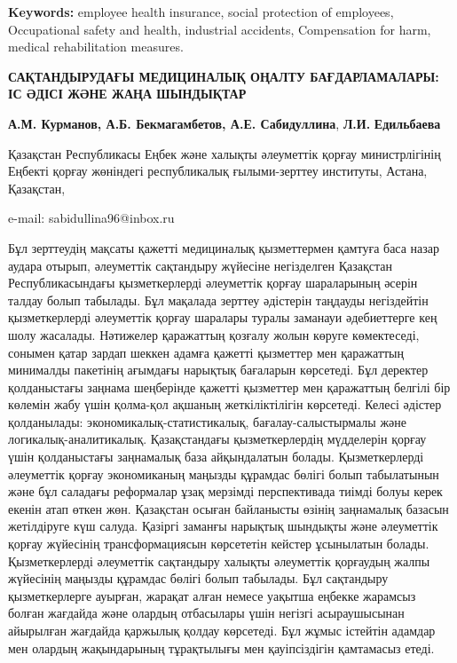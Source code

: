 {\bfseries Keywords:} employee health insurance, social protection of
employees, Occupational safety and health, industrial accidents,
Compensation for harm, medical rehabilitation measures.
\begin{articleheader}

{\bfseries САҚТАНДЫРУДАҒЫ МЕДИЦИНАЛЫҚ ОҢАЛТУ БАҒДАРЛАМАЛАРЫ: ІС ӘДІСІ ЖӘНЕ ЖАҢА ШЫНДЫҚТАР}

{\bfseries А.М. Курманов, А.Б. Бекмагамбетов, А.Е.
Сабидуллина\textsuperscript{\envelope }}, {\bfseries Л.И.} {\bfseries Едильбаева}
\end{articleheader}
\begin{affiliation}

Қазақстан Республикасы Еңбек және халықты әлеуметтік қорғау
министрлігінің Еңбекті қорғау жөніндегі республикалық ғылыми-зерттеу
институты, Астана, Қазақстан,

e-mail: sabidullina96@inbox.ru
\end{affiliation}

Бұл зерттеудің мақсаты қажетті медициналық қызметтермен қамтуға баса
назар аудара отырып, әлеуметтік сақтандыру жүйесіне негізделген
Қазақстан Республикасындағы қызметкерлерді әлеуметтік қорғау шараларының
әсерін талдау болып табылады. Бұл мақалада зерттеу әдістерін таңдауды
негіздейтін қызметкерлерді әлеуметтік қорғау шаралары туралы заманауи
әдебиеттерге кең шолу жасалады. Нәтижелер қаражаттың қозғалу жолын
көруге көмектеседі, сонымен қатар зардап шеккен адамға қажетті қызметтер
мен қаражаттың минималды пакетінің ағымдағы нарықтық бағаларын
көрсетеді. Бұл деректер қолданыстағы заңнама шеңберінде қажетті
қызметтер мен қаражаттың белгілі бір көлемін жабу үшін қолма-қол ақшаның
жеткіліктілігін көрсетеді. Келесі әдістер қолданылады:
экономикалық-статистикалық, бағалау-салыстырмалы және
логикалық-аналитикалық. Қазақстандағы қызметкерлердің мүдделерін қорғау
үшін қолданыстағы заңнамалық база айқындалатын болады. Қызметкерлерді
әлеуметтік қорғау экономиканың маңызды құрамдас бөлігі болып табылатынын
және бұл саладағы реформалар ұзақ мерзімді перспективада тиімді болуы
керек екенін атап өткен жөн. Қазақстан осыған байланысты өзінің
заңнамалық базасын жетілдіруге күш салуда. Қазіргі заманғы нарықтық
шындықты және әлеуметтік қорғау жүйесінің трансформациясын көрсететін
кейстер ұсынылатын болады. Қызметкерлерді әлеуметтік сақтандыру халықты
әлеуметтік қорғаудың жалпы жүйесінің маңызды құрамдас бөлігі болып
табылады. Бұл сақтандыру қызметкерлерге ауырған, жарақат алған немесе
уақытша еңбекке жарамсыз болған жағдайда және олардың отбасылары үшін
негізгі асыраушысынан айырылған жағдайда қаржылық қолдау көрсетеді. Бұл
жұмыс істейтін адамдар мен олардың жақындарының тұрақтылығы мен
қауіпсіздігін қамтамасыз етеді.

